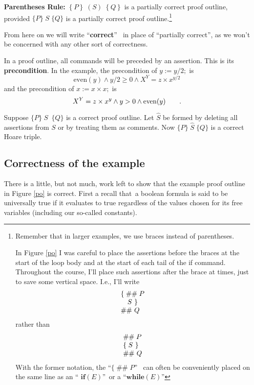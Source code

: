\documentclass[11pt]{article}%
\begin{document}
\textbf{Parentheses Rule:} $\left\{  P\right\}  \;(S)\;\left\{  Q\right\}  $
is a partially correct proof outline, provided $\{P\}\;S\;\{Q\}$ is a
partially correct proof outline.\footnote{Remember that in larger examples, we
use braces instead of parentheses.
\par
In Figure \ref{po} I was careful to place the assertions before the braces at
the start of the loop body and at the start of each tail of the if command.
Throughout the course, I'll place such assertions after the brace at times,
just to save some vertical space. I.e., I'll write%
\[%
\begin{array}
[t]{l}%
\{\;\#\#\;P\\
\quad S\ \}\\
\#\#\ Q
\end{array}
\]
rather than%
\[%
\begin{array}
[t]{l}%
\#\#\;P\\
\{\;S\ \}\\
\#\#\ Q
\end{array}
\]
With the former notation, the \textquotedblleft$\{\;\#\#\;P$\textquotedblright%
\ can often be conveniently placed on the same line as an \textquotedblleft%
$\mathbf{if}(E)$\textquotedblright\ or a \textquotedblleft$\mathbf{while}%
(E)$\textquotedblright}

From here on we will write \textquotedblleft\textbf{correct}\textquotedblright%
\ in place of \textquotedblleft partially correct\textquotedblright, as we
won't be concerned with any other sort of correctness.

In a proof outline, all commands will be preceded by an assertion. This is its
\textbf{precondition}. In the example, the precondition of $y:=y/2;$ is
\[
\mathrm{even}(y)\wedge y/2\geq0\wedge X^{Y}=z\times x^{y/2}%
\]
and the precondition of $x:=x\times x;$ is%
\[
X^{Y}=z\times x^{y}\wedge y>0\wedge\mathrm{even}(y)\text{\qquad.}%
\]


Suppose $\{P\}\;S$\ $\{Q\}$ is a correct proof outline. Let $\widehat{S}$ be
formed by deleting all assertions from $S$ or by treating them as comments.
Now $\{P\}\;\widehat{S}\;\{Q\}$ is a correct Hoare triple.

\subsection{Correctness of the example}

There is a little, but not much, work left to show that the example proof
outline in Figure \ref{po} is correct. First a recall that\ a boolean formula
is said to be universally true if it evaluates to true regardless of the
values chosen for its free variables (including our so-called constants).
\end{document}

